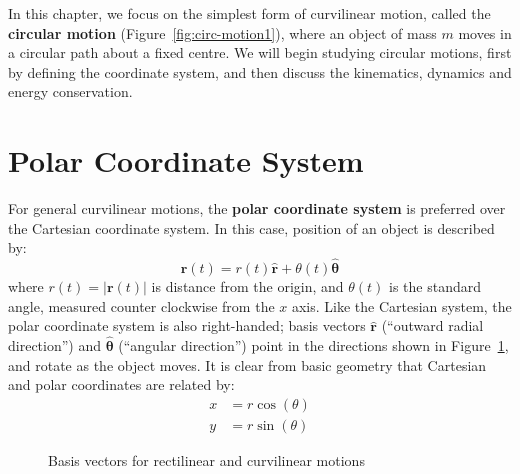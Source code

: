 In this chapter, we focus on the simplest form of curvilinear motion, called the
\textbf{circular motion} (Figure~\ref{fig:circ-motion1}), where an object of
mass $m$ moves in a circular path about a fixed centre. We will begin studying
circular motions, first by defining the coordinate system, and then discuss the
kinematics, dynamics and energy conservation.




\section{Polar Coordinate System}

For general curvilinear motions, the \textbf{polar coordinate system} is
preferred over the Cartesian coordinate system. In this case, position of an
object is described by:
\begin{equation}
  \bm r(t)=r(t)\hat{\bm r} + \theta(t)\hat{\bm\theta}
\end{equation}
where $r(t)=|\bm r(t)|$ is distance from the origin, and $\theta(t)$ is the
standard angle, measured counter clockwise from the $x$ axis. Like the
Cartesian system, the polar coordinate system is also right-handed; basis
vectors $\hat{\bm r}$ (``outward radial direction'') and $\hat{\bm\theta}$
(``angular direction'') point in the directions shown in
Figure~\ref{fig:basis-vecs}, and rotate as the object moves. It is clear from
basic geometry that Cartesian and polar coordinates are related by:
\begin{align*}
  x &=r \cos(\theta)\\
  y &=r \sin(\theta)
\end{align*}
\begin{figure}[ht]
  \centering
  \caption{Basis vectors for rectilinear and curvilinear motions}
  \label{fig:basis-vecs}
\end{figure}



